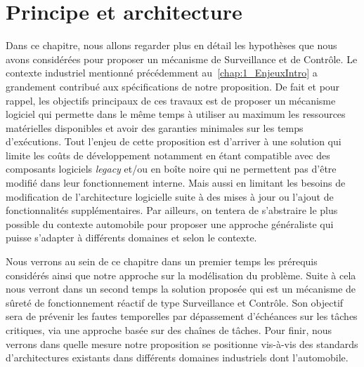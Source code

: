 \documentclass[french, a4paper, 11pt, twoside, pdftex]{StyleThese}
\begin{document}
\setcounter{chapter}{3} %
\dominitoc
\faketableofcontents
\fi

\chapter{Principe et architecture} \label{chap:3_PrincipeArchi}
\minitoc

Dans ce chapitre, nous allons regarder plus en détail les hypothèses que nous avons considérées pour proposer un mécanisme de Surveillance et de Contrôle. Le contexte industriel mentionné précédemment au~\autoref{chap:1_EnjeuxIntro} a grandement contribué aux spécifications de notre proposition. De fait et pour rappel, les objectifs principaux de ces travaux est de proposer un mécanisme logiciel qui permette dans le même temps à utiliser au maximum les ressources matérielles disponibles et avoir des garanties minimales sur les temps d'exécutions. Tout l'enjeu de cette proposition est d'arriver à une solution qui limite les coûts de développement notamment en étant compatible avec des composants logiciels \textit{legacy} et/ou en boîte noire qui ne permettent pas d'être modifié dans leur fonctionnement interne. Mais aussi en limitant les besoins de modification de l'architecture logicielle suite à des mises à jour ou l'ajout de fonctionnalités supplémentaires. Par ailleurs, on tentera de s'abstraire le plus possible du contexte automobile pour proposer une approche généraliste qui puisse s'adapter à différents domaines et selon le contexte. 

Nous verrons au sein de ce chapitre dans un premier temps les prérequis considérés ainsi que notre approche sur la modélisation du problème. Suite à cela nous verront dans un second temps la solution proposée qui est un mécanisme de sûreté de fonctionnement réactif de type Surveillance et Contrôle. Son objectif sera de prévenir les fautes temporelles par dépassement d'échéances sur les tâches critiques, via une approche basée sur des chaînes de tâches.
Pour finir, nous verrons dans quelle mesure notre proposition se positionne vis-à-vis des standards d'architectures existants dans différents domaines industriels dont l'automobile.

\end{document}
